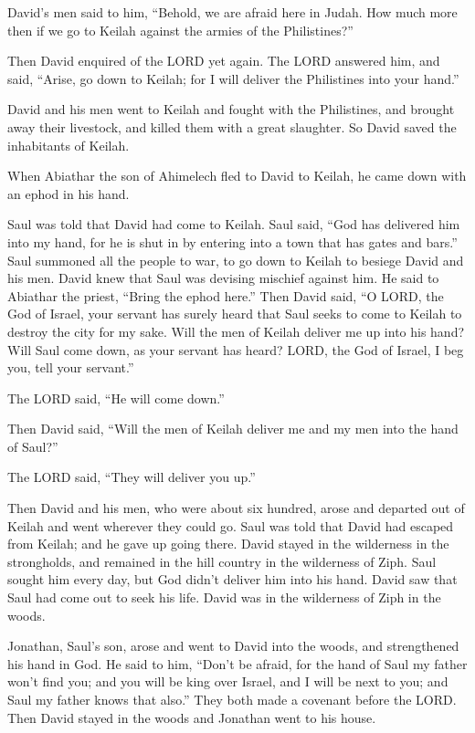 David's men said to him, ``Behold, we are afraid here in
Judah. How much more then if we go to Keilah against the armies of the
Philistines?''

 Then David enquired of the LORD yet again. The LORD
answered him, and said, ``Arise, go down to Keilah; for I will deliver
the Philistines into your hand.''

 David and his men went to Keilah and fought with the
Philistines, and brought away their livestock, and killed them with a
great slaughter. So David saved the inhabitants of Keilah.

 When Abiathar the son of Ahimelech fled to David to
Keilah, he came down with an ephod in his hand.

 Saul was told that David had come to Keilah. Saul said,
``God has delivered him into my hand, for he is shut in by entering into
a town that has gates and bars.''  Saul summoned all the
people to war, to go down to Keilah to besiege David and his men.
 David knew that Saul was devising mischief against him.
He said to Abiathar the priest, ``Bring the ephod here.''
 Then David said, ``O LORD, the God of Israel, your
servant has surely heard that Saul seeks to come to Keilah to destroy
the city for my sake.  Will the men of Keilah deliver me
up into his hand? Will Saul come down, as your servant has heard? LORD,
the God of Israel, I beg you, tell your servant.''

The LORD said, ``He will come down.''

 Then David said, ``Will the men of Keilah deliver me and
my men into the hand of Saul?''

The LORD said, ``They will deliver you up.''

 Then David and his men, who were about six hundred,
arose and departed out of Keilah and went wherever they could go. Saul
was told that David had escaped from Keilah; and he gave up going there.
 David stayed in the wilderness in the strongholds, and
remained in the hill country in the wilderness of Ziph. Saul sought him
every day, but God didn't deliver him into his hand. 
David saw that Saul had come out to seek his life. David was in the
wilderness of Ziph in the woods.

 Jonathan, Saul's son, arose and went to David into the
woods, and strengthened his hand in God.  He said to him,
``Don't be afraid, for the hand of Saul my father won't find you; and
you will be king over Israel, and I will be next to you; and Saul my
father knows that also.''  They both made a covenant
before the LORD. Then David stayed in the woods and Jonathan went to his
house.

